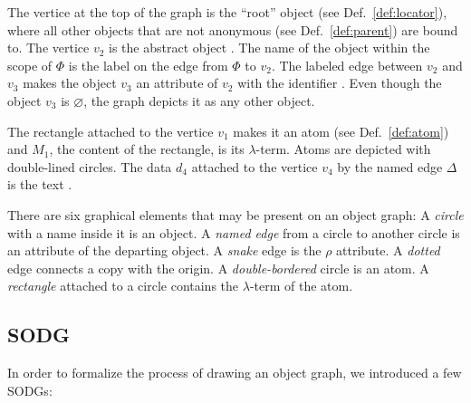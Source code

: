 The vertice at the top of the graph is the ``root'' object (see Def.~\ref{def:locator}),
where all other objects that are not anonymous (see Def.~\ref{def:parent}) are bound to.
The vertice \(v_2\) is the abstract object . The name of the object within the
scope of \(\Phi\) is the label on the edge from \(\Phi\) to \(v_2\). The labeled edge
between \(v_2\) and \(v_3\) makes the object \(v_3\) an attribute of \(v_2\) with the
identifier . Even though the object \(v_3\) is \(\varnothing\), the graph
depicts it as any other object.

The rectangle attached to the vertice \(v_1\) makes it an atom (see Def.~\ref{def:atom})
and \(M_1\), the content of the rectangle, is its \(\lambda\)-term. Atoms
are depicted with double-lined circles. The data \(d_4\)
attached to the vertice \(v_4\) by the named edge \(\Delta\)
is the text .

There are six graphical elements that may be present on an object graph:
A \emph{circle} with a name inside it is an object.
A \emph{named edge} from a circle to another circle is an attribute of the departing object.
A \emph{snake} edge is the \(\rho\) attribute.
A \emph{dotted} edge connects a copy with the origin.
A \emph{double-bordered} circle is an atom.
A \emph{rectangle} attached to a circle contains the \(\lambda\)-term of the atom.

\subsection{SODG}

In order to formalize the process of drawing an object graph,
we introduced a few SODGs:


